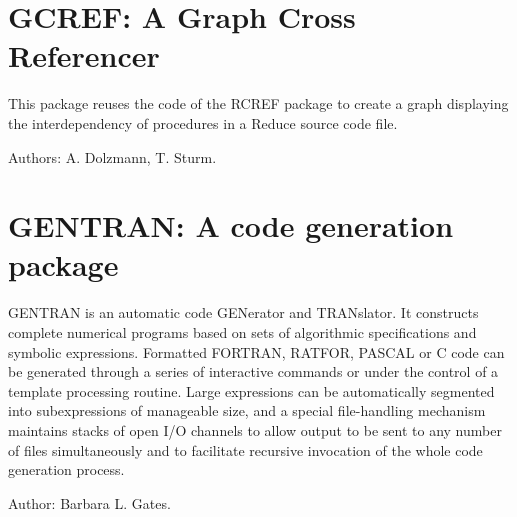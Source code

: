 \section{GCREF: A Graph Cross Referencer}
\label{GCREF}

This package reuses the code of the RCREF package to create a graph displaying
the interdependency of procedures in a Reduce source code file.

Authors: A. Dolzmann, T. Sturm.



\newpage

\section{GENTRAN: A code generation package}
\label{GENTRAN}

GENTRAN is an automatic code GENerator and TRANslator. It constructs
complete numerical programs based on sets of algorithmic specifications
and symbolic expressions. Formatted FORTRAN, RATFOR, PASCAL or C code can be
generated through a series of interactive commands or under the control of
a template processing routine. Large expressions can be automatically
segmented into subexpressions of manageable size, and a special
file-handling mechanism maintains stacks of open I/O channels to allow
output to be sent to any number of files simultaneously and to facilitate
recursive invocation of the whole code generation process.

Author: Barbara L. Gates.


\iffalse
\newpage

\section{GNUPLOT: Display of functions and surfaces}
\indexpackage{PLOT}\indexpackage{GNUPLOT}

This package is an interface to the popular GNUPLOT package.
It allows you to display functions in 2D and surfaces in 3D
on a variety of output devices including X terminals, PC monitors, and
postscript and Latex printer files.

NOTE: The GNUPLOT package may not be included in all versions of REDUCE.

Author: Herbert Melenk.


\fi

\newpage

